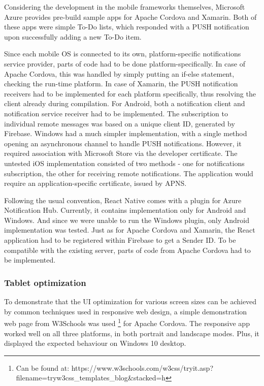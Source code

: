 \documentclass[english,master,public,dept460,male,cpdeclaration,oneside]{diploma}
\begin{document}
Considering the development in the mobile frameworks themselves, Microsoft Azure provides pre-build sample apps for Apache Cordova and Xamarin. Both of these apps were simple To-Do lists, which responded with a PUSH notification upon successfully adding a new To-Do item.

Since each mobile OS is connected to its own, platform-specific notifications service provider, parts of code had to be done platform-specifically. In case of Apache Cordova, this was handled by simply putting an if-else statement, checking the run-time platform. In case of Xamarin, the PUSH notification receivers had to be implemented for each platform specifically, thus resolving the client already during compilation. For Android, both a notification client and notification service receiver had to be implemented. The subscription to individual remote messages was based on a unique client ID, generated by Firebase. Windows had a much simpler implementation, with a single method opening an asynchronous channel to handle PUSH notifications. However, it required association with Microsoft Store via the developer certificate. The untested iOS implementation consisted of two methods - one for notifications subscription, the other for receiving remote notifications. The application would require an application-specific certificate, issued by APNS.

Following the usual convention, React Native comes with a plugin for Azure Notification Hub. Currently, it contains implementation only for Android and Windows. And since we were unable to run the Windows plugin, only Android implementation was tested. Just as for Apache Cordova and Xamarin, the React application had to be registered within Firebase to get a Sender ID. To be compatible with the existing server, parts of code from Apache Cordova had to be implemented. 

\subsubsection{Tablet optimization}
To demonstrate that the UI optimization for various screen sizes can be achieved by common techniques used in responsive web design, a simple demonstration web page from W3Schools was used \footnote{Can be found at: https://www.w3schools.com/w3css/tryit.asp?filename=tryw3css\_templates\_blog\&stacked=h} for Apache Cordova. The responsive app worked well on all three platforms, in both portrait and landscape modes. Plus, it displayed the expected behaviour on Windows 10 desktop.
\end{document}
